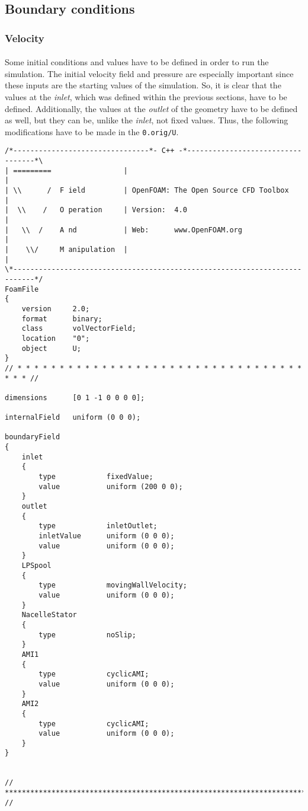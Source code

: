 \subsection{Boundary conditions}


\subsubsection{Velocity}

\paragraph{}Some initial conditions and values have to be defined in order to run the simulation. The initial velocity field and pressure are especially important since these inputs are the starting values of the simulation. So, it is clear that the values at the \textit{inlet}, which was defined within the previous sections, have to be defined. Additionally, the values at the \textit{outlet} of the geometry have to be defined as well, but they can be, unlike the \textit{inlet}, not fixed values. Thus, the following modifications have to be made in the  \texttt{0.orig/U}.

\begin{footnotesize}
\begin{verbatim}
/*--------------------------------*- C++ -*----------------------------------*\
| =========                 |                                                 |
| \\      /  F ield         | OpenFOAM: The Open Source CFD Toolbox           |
|  \\    /   O peration     | Version:  4.0                                   |
|   \\  /    A nd           | Web:      www.OpenFOAM.org                      |
|    \\/     M anipulation  |                                                 |
\*---------------------------------------------------------------------------*/
FoamFile
{
    version     2.0;
    format      binary;
    class       volVectorField;
    location    "0";
    object      U;
}
// * * * * * * * * * * * * * * * * * * * * * * * * * * * * * * * * * * * * * //

dimensions      [0 1 -1 0 0 0 0];

internalField   uniform (0 0 0);

boundaryField
{
    inlet
    {
        type            fixedValue;
        value           uniform (200 0 0);
    }
    outlet
    {
        type            inletOutlet;
        inletValue      uniform (0 0 0);
        value           uniform (0 0 0);
    }
    LPSpool
    {
        type            movingWallVelocity;
        value           uniform (0 0 0);
    }
    NacelleStator
    {
        type            noSlip;
    }
    AMI1
    {
        type            cyclicAMI;
        value           uniform (0 0 0);
    }
    AMI2
    {
        type            cyclicAMI;
        value           uniform (0 0 0);
    }
}


// ************************************************************************* //
\end{verbatim}
\end{footnotesize}

